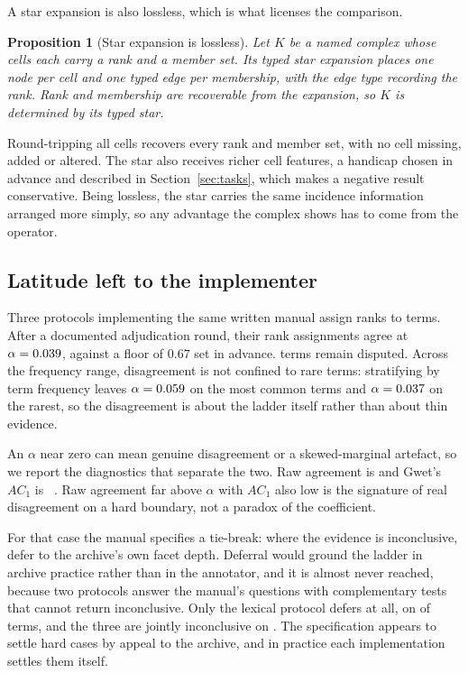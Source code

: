 \documentclass[conference]{IEEEtran}
\newtheorem{proposition}{Proposition}
\begin{document}
A star expansion is also lossless, which is what licenses the comparison.

\begin{proposition}[Star expansion is lossless]
\label{prop:lossless}
Let $K$ be a named complex whose cells each carry a rank and a member set. Its typed
star expansion places one node per cell and one typed edge per membership, with the edge type
recording the rank. Rank and membership are recoverable from the expansion, so $K$ is
determined by its typed star.
\end{proposition}

Round-tripping all \nCells{} cells recovers every rank and member set, with no cell missing,
added or altered. The star also receives richer cell features, a handicap chosen in advance
and described in Section~\ref{sec:tasks}, which makes a negative result conservative. Being
lossless, the star carries the same incidence information arranged more simply, so any
advantage the complex shows has to come from the operator.

\subsection{Latitude left to the implementer}
\label{sec:p2}

Three protocols implementing the same written manual assign ranks to \nRankTerms{} terms.
After a documented adjudication round, their rank assignments agree at $\alpha = 0.039{}$, against a
floor of $0.67$ set in advance. \nDisputed{} terms remain disputed. Across the frequency
range, disagreement is not confined to rare terms: stratifying by term frequency leaves
$\alpha = 0.059{}$ on the
most common terms and $\alpha = 0.037{}$ on the rarest, so the disagreement is about
the ladder itself rather than about thin evidence.

An $\alpha$ near zero can mean genuine disagreement or a skewed-marginal artefact, so we
report the diagnostics that separate the two. Raw agreement is \rawAgreement{} and Gwet's
$AC_1$ is \gwetAC{}~\citep{gwet2008ac1}. Raw agreement far above $\alpha$ with $AC_1$ also
low is the signature of real disagreement on a hard boundary, not a paradox of the
coefficient.

For that case the manual specifies a tie-break: where the evidence is inconclusive, defer to
the archive's own facet depth. Deferral would ground the ladder in archive practice rather
than in the annotator, and it is almost never reached, because two protocols answer the
manual's questions with complementary tests that cannot return inconclusive. Only the lexical
protocol defers at all, on  of terms, and the three are jointly inconclusive on
. The specification appears to settle hard cases by appeal to the archive, and
in practice each implementation settles them itself.
\end{document}
